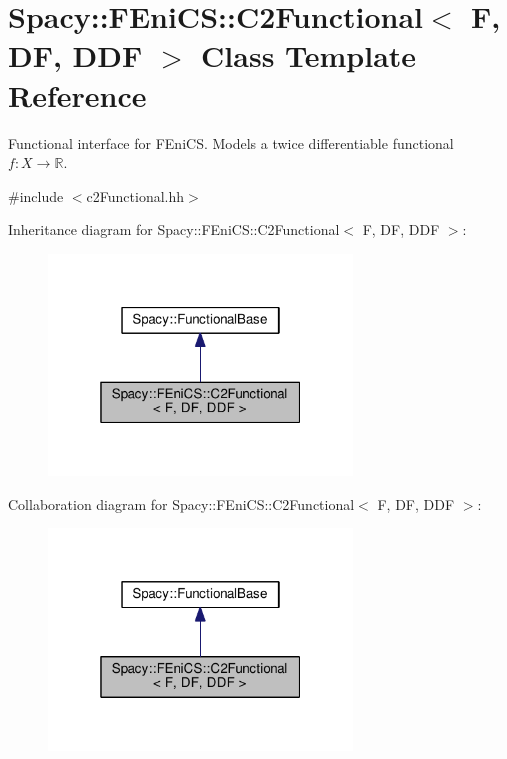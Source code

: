 \hypertarget{classSpacy_1_1FEniCS_1_1C2Functional}{}\section{Spacy\+:\+:F\+Eni\+CS\+:\+:C2\+Functional$<$ F, DF, D\+DF $>$ Class Template Reference}
\label{classSpacy_1_1FEniCS_1_1C2Functional}


Functional interface for F\+Eni\+CS. Models a twice differentiable functional $f:X\rightarrow \mathbb{R}$.  




{\ttfamily \#include $<$c2\+Functional.\+hh$>$}



Inheritance diagram for Spacy\+:\+:F\+Eni\+CS\+:\+:C2\+Functional$<$ F, DF, D\+DF $>$\+:
\nopagebreak
\begin{figure}[H]
\begin{center}
\leavevmode
\includegraphics[width=229pt]{classSpacy_1_1FEniCS_1_1C2Functional__inherit__graph}
\end{center}
\end{figure}


Collaboration diagram for Spacy\+:\+:F\+Eni\+CS\+:\+:C2\+Functional$<$ F, DF, D\+DF $>$\+:
\nopagebreak
\begin{figure}[H]
\begin{center}
\leavevmode
\includegraphics[width=229pt]{classSpacy_1_1FEniCS_1_1C2Functional__coll__graph}
\end{center}
\end{figure}

